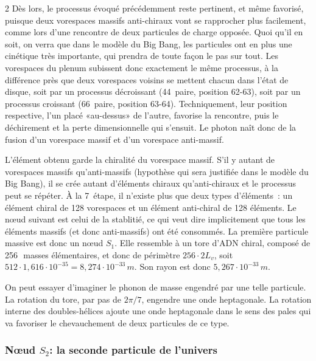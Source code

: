 \begin{multicols}{2}
Dès lors, le processus évoqué précédemment reste pertinent, et même
favorisé, puisque deux vorespaces massifs anti-chiraux vont se
rapprocher plus facilement, comme lors d'une rencontre de deux
particules de charge opposée. Quoi qu'il en soit, on verra que dans le
modèle du Big Bang, les particules ont en plus une cinétique très
importante, qui prendra de toute façon le pas sur tout.
Les vorespaces du plenum subissent donc exactement le même processus,
à la différence près que deux vorespaces voisins se mettent chacun
dans l'état de disque, soit par un processus décroissant (44\ieme\
paire, position 62-63), soit par un processus croissant (66\ieme\ paire,
position 63-64). Techniquement, leur position respective, l'un placé «au-dessus» de
l'autre, favorise la rencontre, puis le déchirement et la perte
dimensionnelle qui s'ensuit. Le photon naît donc de la fusion d'un
vorespace massif et d'un vorespace anti-massif.

L'élément obtenu garde la chiralité du vorespace massif. S'il y autant
de vorespaces massifs qu'anti-massifs (hypothèse qui sera justifiée dans
le modèle du Big Bang), il se crée autant d'éléments chiraux
qu'anti-chiraux et le processus peut se répéter. À la 7\ieme\ étape, il
n'existe plus que deux types d'éléments : un élément chiral de 128
vorespaces et un élément anti-chiral de 128 éléments. Le nœud suivant
est celui de la stablitié, ce qui veut dire implicitement que tous les
éléments massifs (et donc anti-massifs) ont été consommés.
La première particule massive est donc un nœud $S_1$. Elle ressemble à
un tore d'ADN chiral, composé de 256\,~masses élémentaires, et donc de
périmètre $256 \cdot 2L_v$, soit $512 \cdot 1,616 \cdot 10^{-35} = 8,274 \cdot 10^{-33}\,m$. Son rayon
est donc $5,267 \cdot 10^{-33}\,m$.

On peut essayer d'imaginer le phonon de masse engendré par une telle
particule. La rotation du tore, par pas de $2\pi/7$, engendre une onde
heptagonale. La rotation interne des doubles-hélices ajoute une onde
heptagonale dans le sens des pales qui va favoriser le chevauchement
de deux particules de ce type.

\subsubsection{Nœud $S_2$: la seconde particule de l'univers}


\end{multicols}
